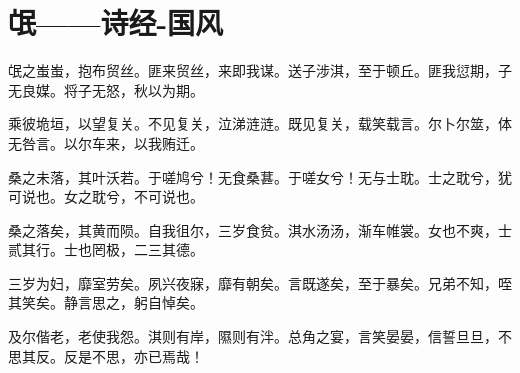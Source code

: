 \section{氓——诗经-国风}


氓之蚩蚩，抱布贸丝。匪来贸丝，来即我谋。送子涉淇，至于顿丘。匪我愆期，子无良媒。将子无怒，秋以为期。

乘彼垝垣，以望复关。不见复关，泣涕涟涟。既见复关，载笑载言。尔卜尔筮，体无咎言。以尔车来，以我贿迁。

桑之未落，其叶沃若。于嗟鸠兮！无食桑葚。于嗟女兮！无与士耽。士之耽兮，犹可说也。女之耽兮，不可说也。

桑之落矣，其黄而陨。自我徂尔，三岁食贫。淇水汤汤，渐车帷裳。女也不爽，士贰其行。士也罔极，二三其德。

三岁为妇，靡室劳矣。夙兴夜寐，靡有朝矣。言既遂矣，至于暴矣。兄弟不知，咥其笑矣。静言思之，躬自悼矣。

及尔偕老，老使我怨。淇则有岸，隰则有泮。总角之宴，言笑晏晏，信誓旦旦，不思其反。反是不思，亦已焉哉！